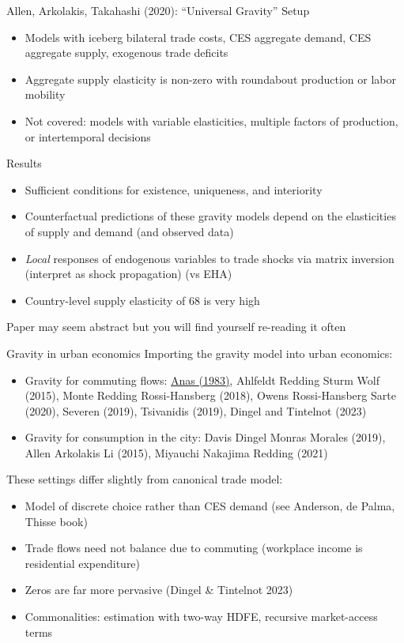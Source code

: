 \documentclass[10pt,notes=hide,aspectratio=169]{beamer}
\begin{document}
\begin{frame}{Allen, Arkolakis, Takahashi (2020): ``Universal Gravity''}
Setup
\begin{itemize}
\item Models with iceberg bilateral trade costs, CES aggregate demand, CES aggregate supply, exogenous trade deficits
\item Aggregate supply elasticity is non-zero with roundabout production or labor mobility
\item Not covered: models with variable elasticities, multiple factors of production, or intertemporal decisions
\end{itemize}
Results
\begin{itemize}
\item Sufficient conditions for existence, uniqueness, and interiority
\item Counterfactual predictions of these gravity models depend on the elasticities of supply and demand (and observed data)
\item \textit{Local} responses of endogenous variables to trade shocks via matrix inversion
(interpret as shock propagation)
(vs EHA)
\item Country-level supply elasticity of 68 is very high
\end{itemize}
Paper may seem abstract but you will find yourself re-reading it often
\end{frame}
\begin{frame}{Gravity in urban economics}
Importing the gravity model into urban economics:
\begin{itemize}
	\item Gravity for commuting flows: 
	\href{https://doi.org/10.1016/0191-2615(83)90023-1}{Anas (1983)},
	Ahlfeldt Redding Sturm Wolf (2015), Monte Redding Rossi-Hansberg (2018), Owens Rossi-Hansberg Sarte (2020), Severen (2019), Tsivanidis (2019), Dingel and Tintelnot (2023)
	\item Gravity for consumption in the city:
	Davis Dingel Monras Morales (2019), Allen Arkolakis Li (2015), Miyauchi Nakajima Redding (2021)
\end{itemize}
These settings differ slightly from canonical trade model: 
\begin{itemize}
	\item Model of discrete choice rather than CES demand (see Anderson, de Palma, Thisse book)
	\item Trade flows need not balance due to commuting (workplace income is residential expenditure)
	\item Zeros are far more pervasive (Dingel \& Tintelnot 2023)
	\item Commonalities: estimation with two-way HDFE, recursive market-access terms
\end{itemize}
\end{frame}
\end{document}

